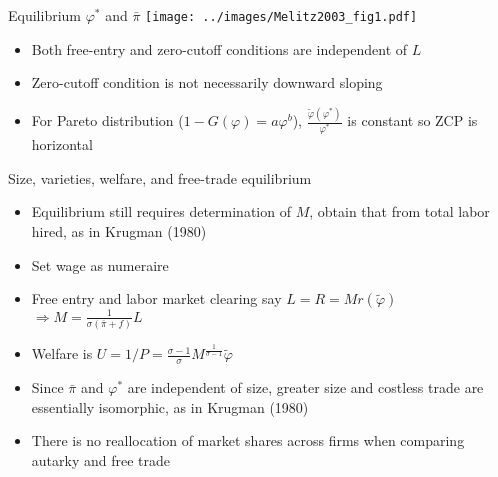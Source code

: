 \documentclass[10pt,notes=hide]{beamer}
\begin{document}
\begin{frame}{Equilibrium $\varphi^*$ and $\bar{\pi}$}
\texttt{[image: ../images/Melitz2003\_fig1.pdf]}
\begin{itemize}
\item Both free-entry and zero-cutoff conditions are independent of $L$
\item Zero-cutoff condition is not necessarily downward sloping
\item For Pareto distribution ($1 - G(\varphi) = a \varphi^b$), $\frac{\tilde{\varphi}(\varphi^*)}{\varphi^*}$ is constant so ZCP is horizontal
\end{itemize}
\end{frame}
\begin{frame}{Size, varieties, welfare, and free-trade equilibrium}
\begin{itemize}
\item Equilibrium still requires determination of $M$, obtain that from total labor hired, as in Krugman (1980)
\item Set wage as numeraire
\item Free entry and labor market clearing say $L=R = M r(\tilde{\varphi})$
$\Rightarrow M = \frac{1}{\sigma(\bar{\pi} + f)} L $
\item Welfare is $U = 1/P = \frac{\sigma-1}{\sigma} M^{\frac{1}{\sigma-1}} \tilde{\varphi}$
\item Since $\bar{\pi}$ and $\varphi^*$ are independent of size, 
greater size and costless trade are essentially isomorphic, as in Krugman (1980)
\item There is no reallocation of market shares across firms when comparing autarky and free trade
\end{itemize}
\end{frame}
\end{document}
